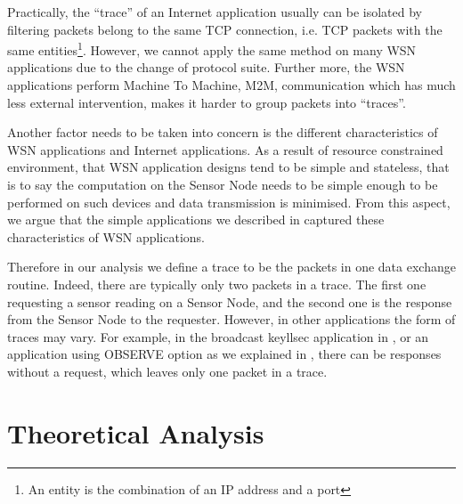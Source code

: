 Practically, the ``trace'' of an Internet application usually can be isolated by filtering packets belong to the same TCP connection, i.e. TCP packets with the same entities\footnote{An entity is the combination of an IP address and a port}. However, we cannot apply the same method on many WSN applications due to the change of protocol suite. Further more, the WSN applications perform Machine To Machine, M2M, communication which has much less external intervention, makes it harder to group packets into ``traces''.

Another factor needs to be taken into concern is the different characteristics of WSN applications and Internet applications. As a result of resource constrained environment, that WSN application designs tend to be simple and stateless, that is to say the computation on the Sensor Node needs to be simple enough to be performed on such devices and data transmission is minimised. From this aspect, we argue that the simple applications we described in  captured these characteristics of WSN applications.  

Therefore in our analysis we define a trace to be the packets in one data exchange routine. Indeed, there are typically only two packets in a trace. The first one requesting a sensor reading on a Sensor Node, and the second one is the response from the Sensor Node to the requester. However, in other applications the form of traces may vary. For example, in the broadcast keyllsec application in , or an application using OBSERVE option as we explained in , there can be responses without a request, which leaves only one packet in a trace.

\section{Theoretical Analysis}





